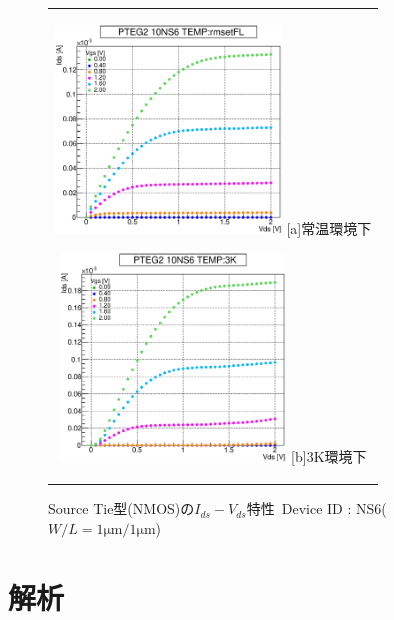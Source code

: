 			\begin{figure}[htbp]
				\begin{center}
					\begin{tabular}{c}
						\begin{minipage}{0.5\hsize}
							\begin{center}
								\includegraphics[clip, width=6cm]{./Chapter/Appendix/Picture/NST/NS6/PTEG2_10_NS6_IdVd_rmsetFL.eps}
								\hspace{1.6cm} [a]常温環境下
							\end{center}
						\end{minipage}
						\begin{minipage}{0.5\hsize}
							\begin{center}
								\includegraphics[clip, width=6cm]{./Chapter/Appendix/Picture/NST/NS6/PTEG2_10_NS6_IdVd_3K.eps}
								\hspace{1.6cm} [b]3K環境下
							\end{center}
						\end{minipage}
					\end{tabular}
					\caption{Source Tie型(NMOS)の$I_{ds}-V_{ds}$特性\ Device ID : NS6($W/L = 1\mathrm{\mu m} / 1\mathrm{\mu m}$)}
					\label{fig:ST_N_IdVd}
				\end{center}
			\end{figure}

		
	\section{解析}
